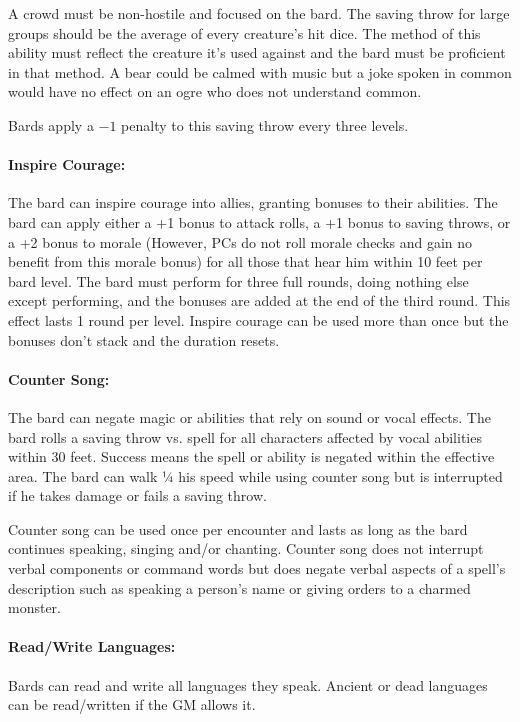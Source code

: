 \begin{multicols}{2}
A crowd must be non-hostile and focused on the bard.  The saving throw for large groups should be the average of every creature's hit dice.  The method of this ability must reflect the creature it's used against and the bard must be proficient in that method.  A bear could be calmed with music but a joke spoken in common would have no effect on an ogre who does not understand common.  

Bards apply a $-1$ penalty to this saving throw every three levels.

\paragraph{Inspire Courage:} The bard can inspire courage into allies, granting bonuses to their abilities.  The bard can apply either a +1 bonus to attack rolls, a +1 bonus to saving throws, or a +2 bonus to morale  (However, PCs do not roll morale checks and gain no benefit from this morale bonus) for all those that hear him within 10 feet per bard level.  The bard must perform for three full rounds, doing nothing else except performing, and the bonuses are added at the end of the third round.  This effect lasts 1 round per level.  Inspire courage can be used more than once but the bonuses don't stack and the duration resets.  

\paragraph{Counter Song:} The bard can negate magic or abilities that rely on sound or vocal effects.  The bard rolls a saving throw vs. spell for all characters affected by vocal abilities within 30 feet.  Success means the spell or ability is negated within the effective area.  The bard can walk ¼ his speed while using counter song but is interrupted if he takes damage or fails a saving throw.  

Counter song can be used once per encounter and lasts as long as the bard continues speaking, singing and/or chanting.  Counter song does not interrupt verbal components or command words but does negate verbal aspects of a spell's description such as speaking a person's name or giving orders to a charmed monster.

\paragraph{Read/Write Languages:}  Bards can read and write all languages they speak.  Ancient or dead languages can be read/written if the GM allows it.


\end{multicols}
